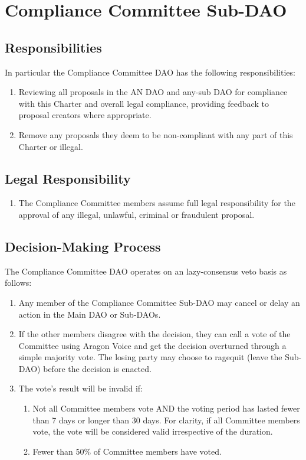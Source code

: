 \section{Compliance Committee Sub-DAO}

\subsection{Responsibilities}

In particular the Compliance Committee \ac{DAO} has the following responsibilities:
\begin{enumerate}
	\item Reviewing all proposals in the AN \ac{DAO} and any-sub \ac{DAO} for
	compliance with this Charter and overall legal compliance,
	providing feedback to proposal creators where appropriate.
	\item Remove any proposals they deem to be non-compliant with any
	part of this Charter or illegal.
\end{enumerate}


\subsection{Legal Responsibility}

\begin{enumerate}
	\item The Compliance Committee members assume full legal responsibility for the approval of any illegal, unlawful, criminal or fraudulent proposal.
\end{enumerate}


\subsection{Decision-Making Process}

The Compliance Committee \ac{DAO} operates on an lazy-consensus veto basis as follows:
\begin{enumerate}
	
	\item Any member of the Compliance Committee Sub-\ac{DAO} may cancel or delay an action in the Main \ac{DAO} or Sub-\acp{DAO}.
	\item If the other members disagree with the decision, they can call a vote of the Committee using Aragon Voice and get the decision overturned through a simple majority vote.
	The losing party may choose to ragequit (leave the Sub-\ac{DAO}) before the decision is enacted.
	\item The vote’s result will be invalid if:
	\begin{enumerate}
		\item Not all Committee members vote AND the voting period
		has lasted fewer than 7 days or longer than 30 days.
		For clarity, if all Committee members vote, the vote will be considered valid irrespective of the duration.
		\item Fewer than 50\% of Committee members have voted.
	\end{enumerate}

\end{enumerate}


